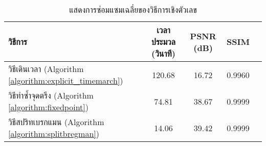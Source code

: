 \begin{table}[H]
    \centering
    \begin{tabular}[ht]{|l|c|c|c|c|}
        \hline
        วิธีการ  & เวลาประมวล  (วินาที) & PSNR (dB) & SSIM \\
        \hline
        วิธีเดินเวลา (Algorithm \ref{algorithm:explicit_timemarch})& 120.68 & 16.72 & 0.9960 \\
        วิธีทำซ้ำจุดตรึง (Algorithm \ref{algorithm:fixedpoint})& 74.81 & 38.67 & 0.9999 \\
        วิธีสปริทเบรกแมน (Algorithm \ref{algorithm:splitbregman}) & 14.06 & 39.42 & 0.9999  \\
        \hline
    \end{tabular}
    \caption{แสดงการซ่อมแซมเฉลี่ยของวิธีการเชิงตัวเลข}
\end{table}	